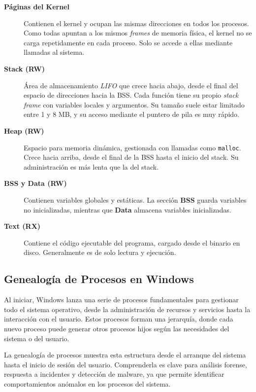 \begin{description}

    \item[\textbf{Páginas del Kernel}]  
    Contienen el kernel y ocupan las mismas direcciones en todos los procesos.  
    Como todas apuntan a los mismos \textit{frames} de memoria física, el kernel no se carga repetidamente en cada proceso.  
    Solo se accede a ellas mediante llamadas al sistema.

    \item[\textbf{Stack (RW)}]  
    Área de almacenamiento \textit{LIFO} que crece hacia abajo, desde el final del espacio de direcciones hacia la BSS.  
    Cada función tiene su propio \textit{stack frame} con variables locales y argumentos.  
    Su tamaño suele estar limitado entre 1 y 8 MB, y su acceso mediante el puntero de pila es muy rápido.

    \item[\textbf{Heap (RW)}]  
    Espacio para memoria dinámica, gestionada con llamadas como \texttt{malloc}.  
    Crece hacia arriba, desde el final de la BSS hasta el inicio del stack.  
    Su administración es más lenta que la del stack.

    \item[\textbf{BSS y Data (RW)}]  
    Contienen variables globales y estáticas.  
    La sección \textbf{BSS} guarda variables no inicializadas, mientras que \textbf{Data} almacena variables inicializadas.

    \item[\textbf{Text (RX)}]  
    Contiene el código ejecutable del programa, cargado desde el binario en disco.  
    Generalmente es de solo lectura y ejecución.

\end{description}

\subsection{Genealogía de Procesos en Windows}

Al iniciar, Windows lanza una serie de procesos fundamentales para gestionar todo el sistema operativo, desde la administración de recursos y servicios hasta la interacción con el usuario. Estos procesos forman una jerarquía, donde cada nuevo proceso puede generar otros procesos hijos según las necesidades del sistema o del usuario.

La genealogía de procesos muestra esta estructura desde el arranque del sistema hasta el inicio de sesión del usuario. Comprenderla es clave para análisis forense, respuesta a incidentes y detección de malware, ya que permite identificar comportamientos anómalos en los procesos del sistema.

